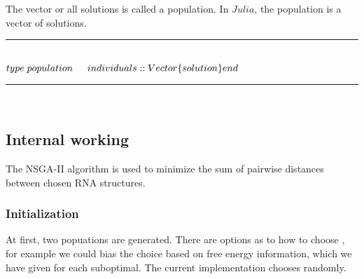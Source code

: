 \documentclass[a4paper, 12pt] {article}
\newcommand{\HRule}{\rule{\linewidth}{0.5mm}}
\begin{document}
The vector or all solutions is called a population. In $Julia$, the population is a vector of
solutions.\\
\HRule \\[0.4cm]
\begin{math}
type \; population\\
\indent  individuals::Vector\{solution\}\\
end
\end{math}\\
\HRule \\[0.4cm]



\subsection*{Internal working}
\noindent
The NSGA-II algorithm is used to minimize the sum of pairwise distances between chosen RNA structures.

\subsubsection*{Initialization}
\noindent
At first, two popuations are generated. There are options as to how to choose , for example we could
bias the choice based on free energy information, which we have given for each suboptimal. The current implementation chooses randomly.

\end{document}
